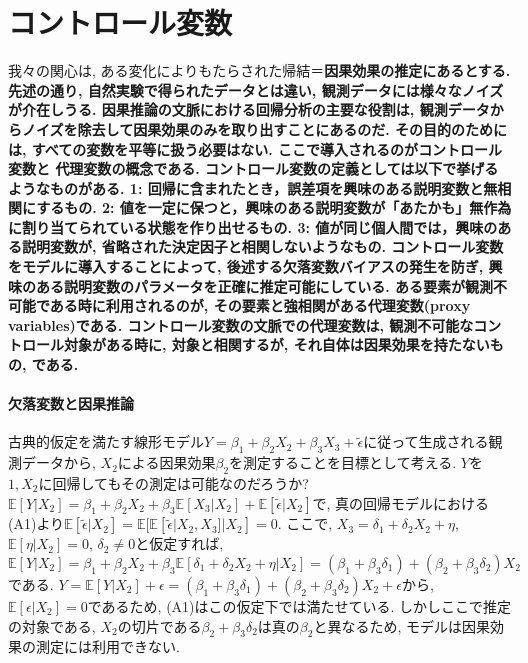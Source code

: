 \documentclass[paper=a4paper,fontsize=10pt]{jlreq}
\begin{document}
\section{コントロール変数}
我々の関心は, ある変化によりもたらされた帰結＝\rmfamily\mcfamily\bfseries{因果効果の推定}\mdseries にあるとする. 先述の通り, 自然実験で得られたデータとは違い, 観測データには様々なノイズが介在しうる. 因果推論の文脈における回帰分析の主要な役割は, 観測データからノイズを除去して因果効果のみを取り出すことにあるのだ. その目的のためには, すべての変数を平等に扱う必要はない. ここで導入されるのが\rmfamily\mcfamily\bfseries{コントロール変数}\mdseries と \rmfamily\mcfamily\bfseries{代理変数}\mdseries の概念である.  コントロール変数の定義としては以下で挙げるようなものがある. 1: 回帰に含まれたとき，誤差項を興味のある説明変数と無相関にするもの. 2: 値を一定に保つと，興味のある説明変数が「あたかも」無作為に割り当てられている状態を作り出せるもの. 3: 値が同じ個人間では，興味のある説明変数が, 省略された決定因子と相関しないようなもの. コントロール変数をモデルに導入することによって, 後述する欠落変数バイアスの発生を防ぎ, 興味のある説明変数のパラメータを正確に推定可能にしている. ある要素が観測不可能である時に利用されるのが, その要素と強相関がある\rmfamily\mcfamily\bfseries{代理変数(proxy variables)}\mdseries である. コントロール変数の文脈での代理変数は, 観測不可能なコントロール対象がある時に, 対象と相関するが, それ自体は因果効果を持たないもの, である.\\

\paragraph{欠落変数と因果推論}
古典的仮定を満たす線形モデル$Y=\beta_1+\beta_2X_{2}+\beta_3X_{3}+\tilde{\epsilon}$に従って生成される観測データから, $X_2$による因果効果$\beta_2$を測定することを目標として考える. $Y$を$1, X_{2}$に回帰してもその測定は可能なのだろうか? $\mathbb{E}[Y|X_{2}]=\beta_1+\beta_2X_{2}+\beta_3\mathbb{E}[X_{3}|X_{2}]+\mathbb{E}[\tilde{\epsilon}|X_{2}]$で, 真の回帰モデルにおける(A1)より$\mathbb{E}[\tilde{\epsilon}|X_{2}]=\mathbb{E}[\mathbb{E}[\tilde{\epsilon}|X_{2}, X_{3}]|X_{2}]=0$. ここで, $X_3=\delta_1+\delta_2 X_{2} + \eta $, $\mathbb{E}[\eta|X_2]=0$, $\delta_2 \neq 0$と仮定すれば, $\mathbb{E}[Y|X_{2}]=\beta_1+\beta_2X_{2}+\beta_3\mathbb{E}[\delta_1+\delta_2 X_{2} + \eta|X_{2}]=(\beta_1+\beta_3\delta_1)+(\beta_2+\beta_3\delta_2)X_{2}$である. $Y=\mathbb{E}[Y|X_{2}]+\epsilon=(\beta_1+\beta_3\delta_1)+(\beta_2+\beta_3\delta_2)X_{2}+\epsilon$から, $\mathbb{E}[\epsilon|X_2]=0$であるため, (A1)はこの仮定下では満たせている. しかしここで推定の対象である, $X_2$の切片である$\beta_2+\beta_3\delta_2$は真の$\beta_2$と異なるため, モデルは因果効果の測定には利用できない.\\
\end{document}
